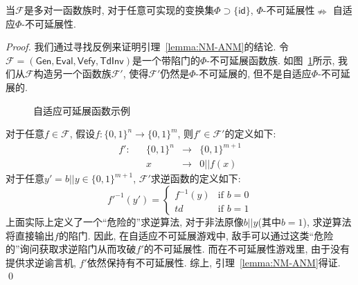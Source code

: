 \begin{lemma}\label{lemma:NM-ANM}
当$\mathcal{F}$是多对一函数族时, 对于任意可实现的变换集$\Phi \supset \{\mathsf{id}\}$, $\Phi$-不可延展性$\nRightarrow$ 自适应$\Phi$-不可延展性.
\end{lemma}
\begin{proof}
我们通过寻找反例来证明引理~\ref{lemma:NM-ANM}的结论. 令$\mathcal{F} = (\mathsf{Gen}, \mathsf{Eval}, \mathsf{Vefy}, \mathsf{TdInv})$是一个带陷门的$\Phi$-不可延展函数族. 如图~\ref{fig:ch5-ANM}所示, 我们从$\mathcal{F}$构造另一个函数族$\mathcal{F}'$, 使得$\mathcal{F}'$仍然是$\Phi$-不可延展的, 但不是自适应$\Phi$-不可延展的.
\begin{figure}[!hbth] 
\begin{center}
\end{center}
\caption{自适应可延展函数示例}\label{fig:ch5-ANM}
\end{figure} 
对于任意$f \in \mathcal{F}$, 假设$f: \{0, 1\}^n \rightarrow \{0, 1\}^m$, 则$f' \in \mathcal{F}'$的定义如下:
\[
\begin{array}{ccccc}
f': & & \{0, 1\}^n &\rightarrow& \{0, 1\}^{m+1} \\
    & & x          &\rightarrow& 0 || f(x)
\end{array}
\]  
对于任意$y' = b||y \in \{0, 1\}^{m+1}$, $\mathcal{F}'$求逆函数的定义如下:
\[
f'^{-1}(y') = \left\{
\begin{array}{cc}
f^{-1}(y) & \text{if $b = 0$}\\
td      & \text{if $b = 1$}
\end{array}
\right.
\]
上面实际上定义了一个``危险的''求逆算法, 对于非法原像$b||y$(其中$b=1$), 求逆算法将直接输出$f$的陷门. 因此, 在自适应不可延展游戏中, 敌手可以通过这类``危险的''询问获取求逆陷门从而攻破$f'$的不可延展性. 而在不可延展性游戏里, 由于没有提供求逆谕言机, $f'$依然保持有不可延展性. 综上, 引理~\ref{lemma:NM-ANM}得证. \qed 
\end{proof}

